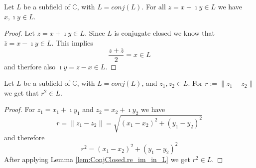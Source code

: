 \begin{lemma}
    \label{lem:ConjClosed.re_im_in_L}
    \leanok
    Let $L$ be a subfield of $\mathbb{C}$, with $L = conj(L)$. For all $z = x + \imath y \in L$ we have $x, \imath y \in L$.
\end{lemma}
\begin{proof}
    Let $z = x + \imath y \in L$. Since $L$ is conjugate closed we know that $\overline{z}=x-\imath y \in L$. This implies
    \begin{equation*}
        \frac{z + \overline{z}}{2} = x \in L
    \end{equation*}
    and therfore also $\imath y = z - x \in L$.
\end{proof}


\begin{lemma}
    \label{lem:ConjClosed.distSq_L}
    \leanok
    Let $L$ be a subfield of $\mathbb{C}$, with $L = conj(L)$, and $z_1, z_2 \in L$.
    For $r := \|z_1-z_2\|$ we get that $r^2 \in L$.
\end{lemma}
\begin{proof}
    For $z_1 = x_1 + \imath y_1$ and $z_2 = x_2 + \imath y_2$ we have
    \begin{equation*}
        r = \|z_1 - z_2\| = \sqrt{(x_1 - x_2)^2 + (y_1 - y_2)^2}
    \end{equation*}
    and therefore
    \begin{equation*}
        r^2 = (x_1 - x_2)^2 + (y_1 - y_2)^2 
    \end{equation*}
    After applying Lemma \ref{lem:ConjClosed.re_im_in_L} we get $r^2 \in L$.
\end{proof}

